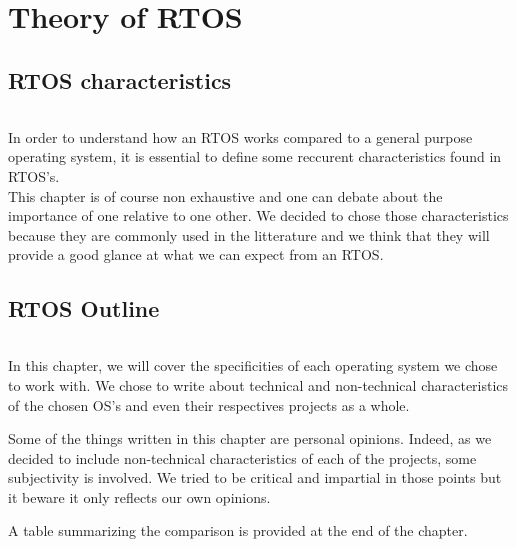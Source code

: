 \part{Theory of RTOS}

\chapter{RTOS characteristics}

\paragraph{}
In order to understand how an RTOS works compared to a general purpose operating system, it is essential to define some reccurent characteristics found in RTOS's.
\\
This chapter is of course non exhaustive and one can debate about the importance of one relative to one other.
We decided to chose those characteristics because they are commonly used in the litterature and we think that they will provide a good glance at what we can expect from an RTOS.











\chapter{RTOS Outline}

\paragraph{}
In this chapter, we will cover the specificities of each operating system we chose to work with.
We chose to write about technical and non-technical characteristics of the chosen OS's and even their respectives projects as a whole.

Some of the things written in this chapter are personal opinions.
Indeed, as we decided to include non-technical characteristics of each of the projects, some subjectivity is involved.
We tried to be critical and impartial in those points but it beware it only reflects our own opinions.


A table summarizing the comparison is provided at the end of the chapter.





